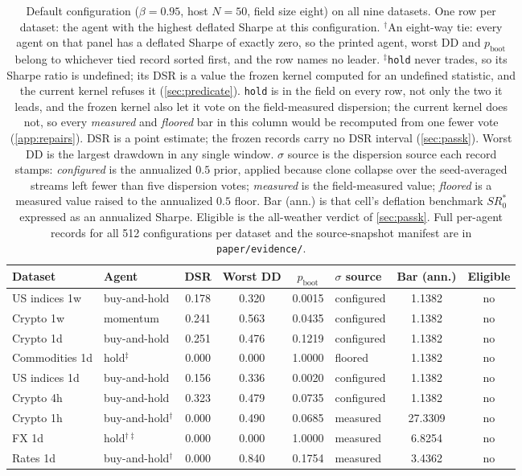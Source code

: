 \begin{table}[t]
\centering
\small
\caption{Default configuration ($\beta = 0.95$, host $N = 50$, field size eight) on all nine datasets. One row per dataset: the agent with the highest deflated Sharpe at this configuration. $^{\dagger}$An eight-way tie: every agent on that panel has a deflated Sharpe of exactly zero, so the printed agent, worst DD and $p_{\text{boot}}$ belong to whichever tied record sorted first, and the row names no leader. $^{\ddagger}$\texttt{hold} never trades, so its Sharpe ratio is undefined; its DSR is a value the frozen kernel computed for an undefined statistic, and the current kernel refuses it (\cref{sec:predicate}). \texttt{hold} is in the field on every row, not only the two it leads, and the frozen kernel also let it vote on the field-measured dispersion; the current kernel does not, so every \emph{measured} and \emph{floored} bar in this column would be recomputed from one fewer vote (\cref{app:repairs}). DSR is a point estimate; the frozen records carry no DSR interval (\cref{sec:passk}). Worst DD is the largest drawdown in any single window. $\sigma$ source is the dispersion source each record stamps: \emph{configured} is the annualized $0.5$ prior, applied because clone collapse over the seed-averaged streams left fewer than five dispersion votes; \emph{measured} is the field-measured value; \emph{floored} is a measured value raised to the annualized $0.5$ floor. Bar (ann.) is that cell's deflation benchmark $SR^{*}_{0}$ expressed as an annualized Sharpe. Eligible is the all-weather verdict of \cref{sec:passk}. Full per-agent records for all 512 configurations per dataset and the source-snapshot manifest are in \texttt{paper/evidence/}.}
\label{tab:eligibility}
\setlength{\tabcolsep}{3.5pt}
\footnotesize
\begin{tabular}{llS[table-format=1.3]S[table-format=1.3]S[table-format=1.4]lS[table-format=2.4]c}
\toprule
Dataset & Agent & {DSR} & {Worst DD} & {$p_{\text{boot}}$} & $\sigma$ source & {Bar (ann.)} & Eligible \\
\midrule
US indices 1w & buy-and-hold & 0.178 & 0.320 & 0.0015 & configured & 1.1382 & no \\
Crypto 1w & momentum & 0.241 & 0.563 & 0.0435 & configured & 1.1382 & no \\
Crypto 1d & buy-and-hold & 0.251 & 0.476 & 0.1219 & configured & 1.1382 & no \\
Commodities 1d & hold$^{\ddagger}$ & 0.000 & 0.000 & 1.0000 & floored & 1.1382 & no \\
US indices 1d & buy-and-hold & 0.156 & 0.336 & 0.0020 & configured & 1.1382 & no \\
Crypto 4h & buy-and-hold & 0.323 & 0.479 & 0.0735 & configured & 1.1382 & no \\
Crypto 1h & buy-and-hold$^{\dagger}$ & 0.000 & 0.490 & 0.0685 & measured & 27.3309 & no \\
FX 1d & hold$^{\dagger\ddagger}$ & 0.000 & 0.000 & 1.0000 & measured & 6.8254 & no \\
Rates 1d & buy-and-hold$^{\dagger}$ & 0.000 & 0.840 & 0.1754 & measured & 3.4362 & no \\
\bottomrule
\end{tabular}
\end{table}

